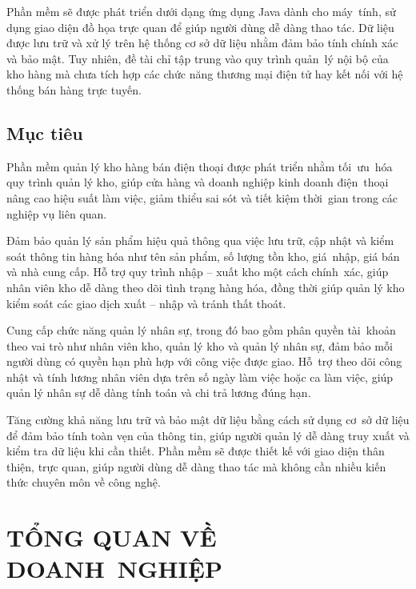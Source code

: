 \documentclass[a4paper,12pt]{report}
\begin{document}
\quad Phần mềm sẽ được phát triển dưới dạng ứng dụng Java dành cho máy~tính, sử dụng giao diện đồ họa trực quan để giúp người dùng dễ dàng thao tác. Dữ liệu được lưu trữ và xử lý trên hệ thống cơ sở dữ liệu nhằm đảm bảo tính chính xác và bảo mật. Tuy nhiên, đề tài chỉ tập trung vào quy trình quản~lý nội bộ của kho hàng mà chưa tích hợp các chức năng thương mại điện tử hay kết nối với hệ thống bán hàng trực tuyến.
\section{Mục tiêu}
\quad Phần mềm quản lý kho hàng bán điện thoại được phát triển nhằm tối~ưu~hóa quy trình quản lý kho, giúp cửa hàng và doanh nghiệp kinh doanh điện~thoại nâng cao hiệu suất làm việc, giảm thiểu sai sót và tiết kiệm thời~gian trong các nghiệp vụ liên quan.

\vspace{0.8em}

\quad Đảm bảo quản lý sản phẩm hiệu quả thông qua việc lưu trữ, cập nhật và kiểm soát thông tin hàng hóa như tên sản phẩm, số lượng tồn kho, giá~nhập, giá bán và nhà cung cấp. Hỗ trợ quy trình nhập – xuất kho một cách chính~xác, giúp nhân viên kho dễ dàng theo dõi tình trạng hàng hóa, đồng thời giúp quản lý kho kiểm soát các giao dịch xuất – nhập và tránh thất thoát.

\vspace{0.8em}

\quad Cung cấp chức năng quản lý nhân sự, trong đó bao gồm phân quyền tài~khoản theo vai trò như nhân viên kho, quản lý kho và quản lý nhân sự, đảm bảo mỗi người dùng có quyền hạn phù hợp với công việc được giao. Hỗ~trợ theo dõi công nhật và tính lương nhân viên dựa trên số ngày làm việc hoặc ca làm việc, giúp quản lý nhân sự dễ dàng tính toán và chi trả lương đúng hạn.

\vspace{0.8em}

\quad Tăng cường khả năng lưu trữ và bảo mật dữ liệu bằng cách sử dụng cơ~sở dữ liệu để đảm bảo tính toàn vẹn của thông tin, giúp người quản lý dễ dàng truy xuất và kiểm tra dữ liệu khi cần thiết. Phần mềm sẽ được thiết kế với giao diện thân thiện, trực quan, giúp người dùng dễ dàng thao tác mà không cần nhiều kiến thức chuyên môn về công nghệ.

\chapter{TỔNG QUAN VỀ DOANH~NGHIỆP}
\end{document}
